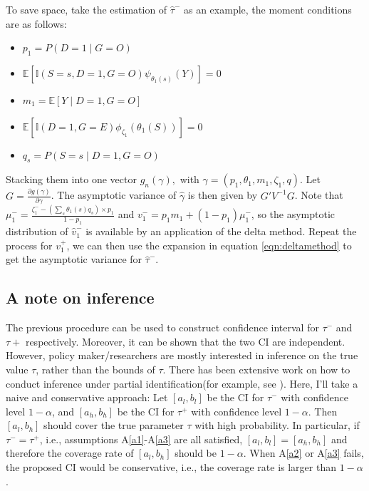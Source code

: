 \documentclass[12pt]{article}
\newcommand{\Indc}{\mathbb{I}}
\begin{document}
    To save space, take the estimation of $\hat{\tau}^-$ as an example, the moment conditions are as follows: 
	\begin{itemize}
	    \item 	$p_1 = P(D = 1 \mid G = O)$
	    
	    \item $\mathbb{E}\left[\mathbb{I}(S=s, D=1, G = O) \psi_{\theta_1(s)}(Y)\right]  = 0$
	    
        \item $m_1 = \mathbb{E}[Y \mid D = 1, G = O]$
        
        \item $\mathbb{E}\left[\Indc(D=1,G=E)\phi_{{\zeta}_1}(\theta_1(S))\right] = 0$
        
        \item $q_s = P(S=s \mid D=1, G=O)$
	\end{itemize}
	Stacking them into one vector $g_n(\gamma), $ with $\gamma = (p_1, \theta_1, m_1, \zeta_1, q)$. Let $G = \frac{\partial g(\gamma)}{\partial \gamma}$. The asymptotic variance of $\hat{\gamma}$ is then given by $G'V^{-1}G$. Note that $\mu_1^- = \frac{\zeta_1^- - (\sum_s \theta_1(s) q_s)  \times p_1}{1 - p_1}$ and $v_1^- = p_1 m_1 + (1 - p_1) \mu_1^- $, so the asymptotic distribution of $\hat{v}_1^-$ is available by an application of the delta method. Repeat the process for $v_1^+$, we can then use the expansion in equation \ref{eqn:deltamethod} to get the asymptotic variance for $\hat{\tau}^-.$
	
	\subsection{A note on inference}
	The previous procedure can be used to construct confidence interval for $\tau^-$ and $\tau+$ respectively. 
    Moreover, it can be shown that the two CI are independent. 
    However, policy maker/researchers are mostly interested in inference on the true value $\tau$, rather than the bounds of $\tau$. 
    There has been extensive work on how to conduct inference under partial identification(for example, see \textcite{Andrews2007InferenceFP, stoye2020simple}). 
    Here, I'll take a naive and conservative approach: Let $[a_l, b_l]$ be the CI for $\tau^-$ with confidence level $1 - \alpha$, and $[a_h, b_h]$ be the CI for $\tau^+$ with confidence level $1 - \alpha$. 
    Then $[a_l, b_h]$ should cover the true parameter $\tau$ with high probability. 
    In particular, if $\tau^- = \tau^+$, i.e., assumptions A\ref{a1}-A\ref{a3} are all satisfied, $[a_l, b_l] = [a_h, b_h]$ and therefore the coverage rate of $[a_l, b_h]$ should be $1 - \alpha$. 
    When A\ref{a2} or A\ref{a3} fails, the proposed CI would be conservative, i.e., the coverage rate is larger than $1 - \alpha$.
	
\end{document}
